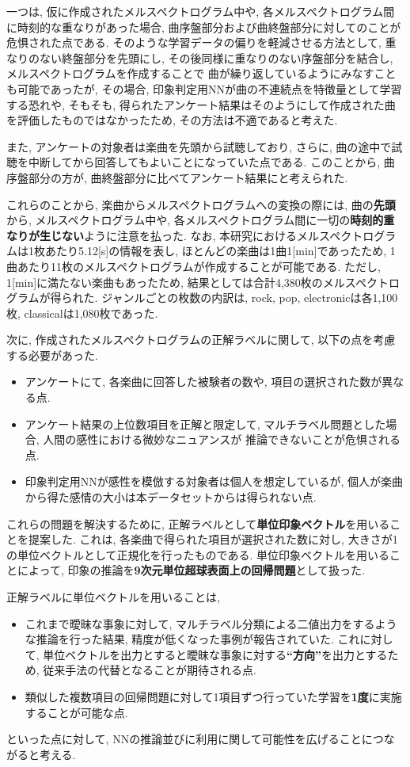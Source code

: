 \documentclass[a4paper,11pt,dvipdfmx]{jreport}
\begin{document}
一つは, 仮に作成されたメルスペクトログラム中や, 各メルスペクトログラム間に時刻的な重なりがあった場合, 
曲序盤部分および曲終盤部分に対してのことが危惧された点である.
そのような学習データの偏りを軽減させる方法として, 
重なりのない終盤部分を先頭にし, その後同様に重なりのない序盤部分を結合し, メルスペクトログラムを作成することで
曲が繰り返しているようにみなすことも可能であったが, その場合, 印象判定用NNが曲の不連続点を特徴量として学習する恐れや, 
そもそも, 得られたアンケート結果はそのようにして作成された曲を評価したものではなかったため, その方法は不適であると考えた.

また, アンケートの対象者は楽曲を先頭から試聴しており, さらに, 曲の途中で試聴を中断してから回答してもよいことになっていた点である.
このことから, 曲序盤部分の方が, 曲終盤部分に比べてアンケート結果にと考えられた.

これらのことから, 楽曲からメルスペクトログラムへの変換の際には, 
曲の\textbf{先頭}から, メルスペクトログラム中や, 各メルスペクトログラム間に一切の\textbf{時刻的重なりが生じない}ように注意を払った.
なお, 本研究におけるメルスペクトログラムは1枚あたり5.12[s]の情報を表し, ほとんどの楽曲は1曲1[min]であったため,
1曲あたり11枚のメルスペクトログラムが作成することが可能である.
ただし, 1[min]に満たない楽曲もあったため, 結果としては合計4,380枚のメルスペクトログラムが得られた.
ジャンルごとの枚数の内訳は, rock, pop, electronicは各1,100枚, classicalは1,080枚であった.

次に, 作成されたメルスペクトログラムの正解ラベルに関して, 以下の点を考慮する必要があった.
\begin{itemize}
  \item アンケートにて, 各楽曲に回答した被験者の数や, 項目の選択された数が異なる点.
  \item アンケート結果の上位数項目を正解と限定して, マルチラベル問題とした場合, 人間の感性における微妙なニュアンスが
        推論できないことが危惧される点.
  \item 印象判定用NNが感性を模倣する対象者は個人を想定しているが, 個人が楽曲から得た感情の大小は本データセットからは得られない点. 
\end{itemize}
これらの問題を解決するために, 正解ラベルとして\textbf{単位印象ベクトル}を用いることを提案した.
これは, 各楽曲で得られた項目が選択された数に対し, 大きさが1の単位ベクトルとして正規化を行ったものである.
単位印象ベクトルを用いることによって, 印象の推論を\textbf{9次元単位超球表面上の回帰問題}として扱った. 

正解ラベルに単位ベクトルを用いることは, 
\begin{itemize}
  \item これまで曖昧な事象に対して, マルチラベル分類による二値出力をするような推論を行った結果, 精度が低くなった事例が報告されていた.
        これに対して, 単位ベクトルを出力とすると曖昧な事象に対する\textbf{``方向''}を出力とするため, 従来手法の代替となることが期待される点.
  \item 類似した複数項目の回帰問題に対して1項目ずつ行っていた学習を\textbf{1度}に実施することが可能な点.
\end{itemize}
といった点に対して, NNの推論並びに利用に関して可能性を広げることにつながると考える.
\end{document}
